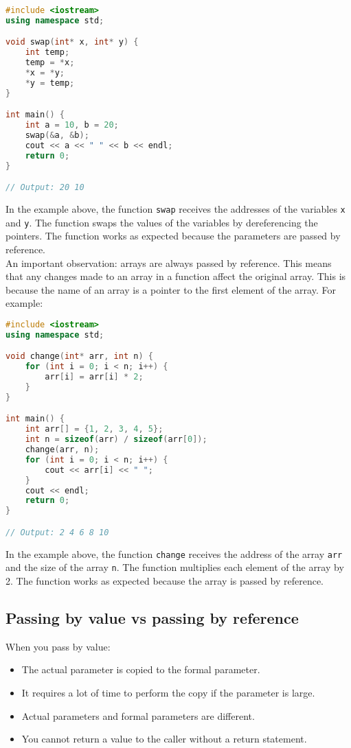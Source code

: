 \begin{lstlisting}[language=C++]
#include <iostream>
using namespace std;

void swap(int* x, int* y) {
    int temp;
    temp = *x;
    *x = *y;
    *y = temp;
}

int main() {
    int a = 10, b = 20;
    swap(&a, &b);
    cout << a << " " << b << endl;
    return 0;
}

// Output: 20 10
\end{lstlisting}

In the example above, the function \texttt{swap} receives the addresses of the
variables \texttt{x} and \texttt{y}. The function swaps the values of the
variables by dereferencing the pointers. The function works as expected because
the parameters are passed by reference.\\

An important observation: arrays are always passed by reference. This means that
any changes made to an array in a function affect the original array. This is 
because the name of an array is a pointer to the first element of the array. For
example:\\

\begin{lstlisting}[language=C++]
#include <iostream>
using namespace std;

void change(int* arr, int n) {
    for (int i = 0; i < n; i++) {
        arr[i] = arr[i] * 2;
    }
}

int main() {
    int arr[] = {1, 2, 3, 4, 5};
    int n = sizeof(arr) / sizeof(arr[0]);
    change(arr, n);
    for (int i = 0; i < n; i++) {
        cout << arr[i] << " ";
    }
    cout << endl;
    return 0;
}

// Output: 2 4 6 8 10
\end{lstlisting}

In the example above, the function \texttt{change} receives the address of the
array \texttt{arr} and the size of the array \texttt{n}. The function multiplies
each element of the array by 2. The function works as expected because the array
is passed by reference.

\subsection{Passing by value vs passing by reference}

When you pass by value:

\begin{itemize}
    \item The actual parameter is copied to the formal parameter.
    \item It requires a lot of time to perform the copy if the parameter is large.
    \item Actual parameters and formal parameters are different.
    \item You cannot return a value to the caller without a return statement.
\end{itemize}

